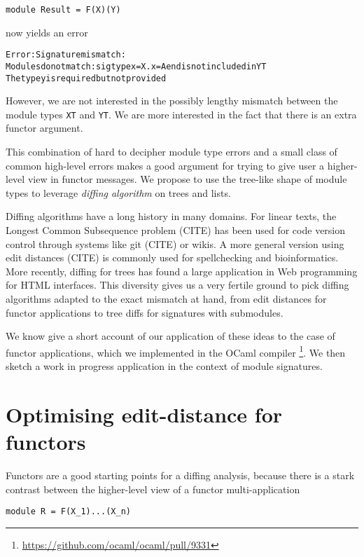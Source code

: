 \documentclass[a4paper,11pt]{scrartcl}
\begin{document}
\begin{verbatim}
module Result = F(X)(Y)
\end{verbatim}
now yields an error
\begin{alltt}
Error: Signature mismatch:
       Modules do not match: sig type x = X.x = A end is not included in YT
       The type y is required but not provided
\end{alltt}

However, we are not interested in the possibly lengthy mismatch between the module types \texttt{XT} and
\texttt{YT}. We are more interested in the fact that there is an extra functor argument.

This combination of hard to decipher module type errors and a small class of common high-level errors makes
a good argument for trying to give user a higher-level view in functor messages.
We propose to use the tree-like shape of module types to leverage
\emph{diffing algorithm} on trees and lists.

Diffing algorithms have a long history in many domains. For linear texts, the
Longest Common Subsequence problem (CITE) has been used for code version control through systems like git (CITE) or wikis. A more general version
using edit distances (CITE) is commonly used for spellchecking and bioinformatics.
More recently, diffing for trees has found a large application
in Web programming for HTML interfaces. This diversity gives
us a very fertile ground to pick diffing algorithms adapted to the exact
mismatch at hand, from edit distances for functor applications to
tree diffs for signatures with submodules.

We know give
a short account of our application of these ideas to the case
of functor applications, which
we implemented in the OCaml compiler%
\footnote{\url{https://github.com/ocaml/ocaml/pull/9331}}.
We then sketch a work in progress application in the context of module signatures.

\section{Optimising edit-distance for functors}

Functors are a good starting points for a diffing analysis, because there is a
stark contrast between the higher-level view of a functor multi-application

\begin{verbatim}
module R = F(X_1)...(X_n)
\end{verbatim}
\end{document}

